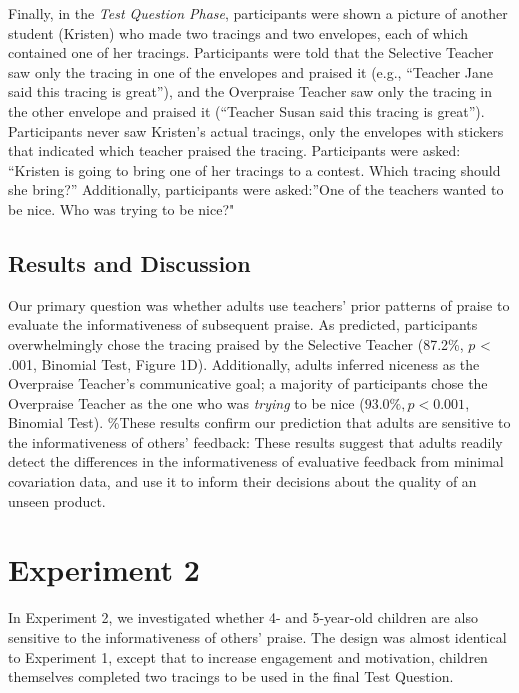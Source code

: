 \documentclass[10pt, letterpaper]{article}
\begin{document}
Finally, in the \textit{Test Question Phase}, participants were shown a
picture of another student (Kristen) who made two tracings and two
envelopes, each of which contained one of her tracings. Participants
were told that the Selective Teacher saw only the tracing in one of the
envelopes and praised it (e.g., ``Teacher Jane said this tracing is
great''), and the Overpraise Teacher saw only the tracing in the other
envelope and praised it (``Teacher Susan said this tracing is great'').
Participants never saw Kristen's actual tracings, only the envelopes
with stickers that indicated which teacher praised the tracing.
Participants were asked: ``Kristen is going to bring one of her tracings
to a contest. Which tracing should she bring?'' Additionally,
participants were asked:''One of the teachers wanted to be nice. Who was
trying to be nice?"

\subsection{Results and Discussion}\label{results-and-discussion}

Our primary question was whether adults use teachers' prior patterns of
praise to evaluate the informativeness of subsequent praise. As
predicted, participants overwhelmingly chose the tracing praised by the
Selective Teacher (87.2\%, \(p\) \textless{} .001, Binomial Test, Figure
1D). Additionally, adults inferred niceness as the Overpraise Teacher's
communicative goal; a majority of participants chose the Overpraise
Teacher as the one who was \emph{trying} to be nice
(\(93.0\%, p < 0.001\), Binomial Test). \%These results confirm our
prediction that adults are sensitive to the informativeness of others'
feedback: These results suggest that adults readily detect the
differences in the informativeness of evaluative feedback from minimal
covariation data, and use it to inform their decisions about the quality
of an unseen product.

\section{Experiment 2}\label{experiment-2}

In Experiment 2, we investigated whether 4- and 5-year-old children are
also sensitive to the informativeness of others' praise. The design was
almost identical to Experiment 1, except that to increase engagement and
motivation, children themselves completed two tracings to be used in the
final Test Question.
\end{document}
